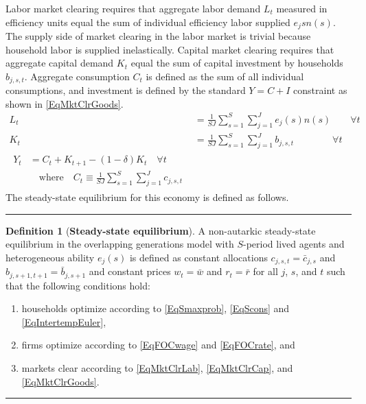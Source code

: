 \documentclass[letterpaper,12pt]{article}
\theoremstyle{definition}
\newtheorem{definition}{Definition} %
\begin{document}
\begin{spacing}{1.5}
    Labor market clearing requires that aggregate labor demand $L_t$ measured in efficiency units equal the sum of individual efficiency labor supplied $e_j{s}n(s)$. The supply side of market clearing in the labor market is trivial because household labor is supplied inelastically. Capital market clearing requires that aggregate capital demand $K_t$ equal the sum of capital investment by households $b_{j,s,t}$. Aggregate consumption $C_t$ is defined as the sum of all individual consumptions, and investment is defined by the standard $Y = C + I$ constraint as shown in \eqref{EqMktClrGoods}.
    \begin{align}
      L_t &= \frac{1}{SJ}\sum_{s=1}^S\sum_{j=1}^{J} e_j(s)n(s) \quad\quad \forall t \label{EqMktClrLab} \\
      K_t &= \frac{1}{SJ}\sum_{s=1}^{S}\sum_{j=1}^{J}b_{j,s,t} \quad\quad\quad\quad \forall t \label{EqMktClrCap} \\
      \begin{split}
        Y_t &= C_t + K_{t+1} - (1-\delta)K_t \quad\forall t \\
        &\quad\text{where}\quad C_t \equiv \frac{1}{SJ}\sum_{s=1}^{S}\sum_{j=1}^{J}c_{j,s,t}
      \end{split} \label{EqMktClrGoods}
    \end{align}
    The steady-state equilibrium for this economy is defined as follows.

    \vspace{7mm}
    \hrule
    \begin{definition}[\textbf{Steady-state equilibrium}]\label{DefEquilSS}
      A non-autarkic steady-state equilibrium in the overlapping generations model with $S$-period lived agents and heterogeneous ability $e_j(s)$ is defined as constant allocations $c_{j,s,t}=\bar{c}_{j,s}$ and $b_{j,s+1,t+1}=\bar{b}_{j,s+1}$ and constant prices $w_t=\bar{w}$ and $r_t=\bar{r}$ for all $j$, $s$, and $t$ such that the following conditions hold:
       \begin{enumerate}
          \item households optimize according to \eqref{EqSmaxprob}, \eqref{EqScons} and \eqref{EqIntertempEuler},
          \item firms optimize according to \eqref{EqFOCwage} and \eqref{EqFOCrate}, and
          \item markets clear according to \eqref{EqMktClrLab}, \eqref{EqMktClrCap}, and \eqref{EqMktClrGoods}.
       \end{enumerate}
    \end{definition}
    \hrule
    \vspace{10mm}


\end{spacing}
\end{document}
